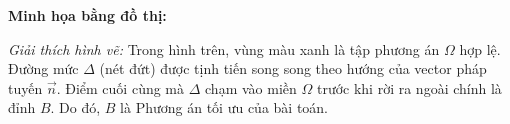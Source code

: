 \vspace{0.5cm}
\textbf{Minh họa bằng đồ thị:}


\textit{Giải thích hình vẽ:} Trong hình trên, vùng màu xanh là tập phương án $\Omega$ hợp lệ. Đường mức $\Delta$ (nét đứt) được tịnh tiến song song theo hướng của vector pháp tuyến $\vec{n}$. Điểm cuối cùng mà $\Delta$ chạm vào miền $\Omega$ trước khi rời ra ngoài chính là đỉnh $B$. Do đó, $B$ là Phương án tối ưu của bài toán.
